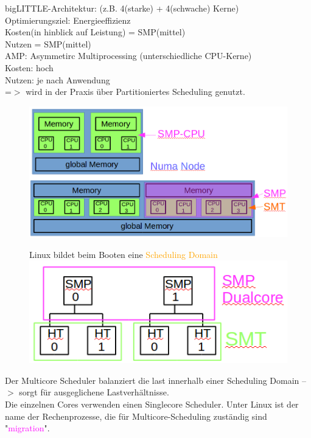 \documentclass[12pt,a4paper,oneside,ngerman]{article}
\begin{document}
bigLITTLE-Architektur: (z.B. 4(starke) + 4(schwache) Kerne) \\
Optimierungsziel: Energieeffizienz\\
Kosten(in hinblick auf Leistung) = SMP(mittel)\\
Nutzen = SMP(mittel)\\

AMP: Asymmetirc Multiprocessing (unterschiedliche CPU-Kerne)\\
Kosten: hoch\\
Nutzen: je nach Anwendung\\
=$>$ wird in der Praxis über Partitioniertes Scheduling genutzt.

\begin{figure}[H]
	\centering
	\includegraphics[scale=0.4]{umlet/numa_node.png}
\end{figure}

\begin{figure}[H]
	Linux bildet beim Booten eine \textcolor{orange}{Scheduling Domain}
	\centering
	\includegraphics[scale=0.6]{umlet/scheduling_domain.png}
\end{figure}

Der Multicore Scheduler balanziert die last innerhalb einer Scheduling Domain --$>$ sorgt für ausgeglichene Lastverhältnisse.\\
Die einzelnen Cores verwenden einen Singlecore Scheduler.
Unter Linux ist der name der Rechenprozesse, die für Multicore-Scheduling zuständig sind "\textcolor{magenta}{migration}".\\
\end{document}
